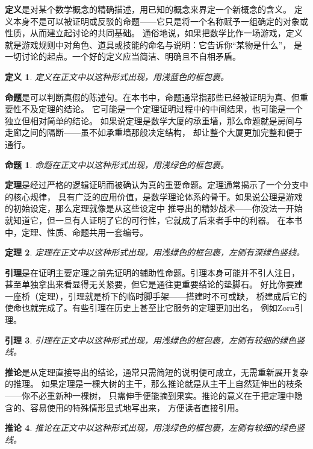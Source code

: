 \documentclass[fontset=none]{ctexbook} %
\newtheorem{theorem}{定理}[section]
\newtheorem{corollary}[theorem]{推论}
\newtheorem{proposition}[theorem]{命题}
\newtheorem{lemma}[theorem]{引理}
\newtheorem{definition}{定义}[section]
\theoremstyle{plain}
\numberwithin{equation}{subsection}%
\numberwithin{figure}{subsection}
\begin{document}
\textbf{定义}是对某个数学概念的精确描述，用已知的概念来界定一个新概念的含义。
定义本身不是可以被证明或反驳的命题——它只是将一个名称赋予一组确定的对象或性质，从而建立起讨论的共同基础。
通俗地说，如果把数学比作一场游戏，定义就是游戏规则中对角色、道具或技能的命名与说明：它告诉你“某物是什么”，
是一切讨论的起点。一个好的定义应当简洁、明确且不自相矛盾。
\begin{definition}
  定义在正文中以这种形式出现，用浅蓝色的框包裹。
\end{definition}

\textbf{命题}是可以判断真假的陈述句。在本书中，命题通常指那些已经被证明为真、但重要性不及定理的结论。
它可能是一个定理证明过程中的中间结果，也可能是一个独立但相对简单的结论。
如果说定理是数学大厦的承重墙，那么命题就是房间与走廊之间的隔断——虽不如承重墙那般决定结构，
却让整个大厦更加完整和便于通行。
\begin{proposition}
  命题在正文中以这种形式出现，用浅绿色的框包裹。
\end{proposition}

\textbf{定理}是经过严格的逻辑证明而被确认为真的重要命题。定理通常揭示了一个分支中的核心规律，
具有广泛的应用价值，是数学理论体系的骨干。如果说公理是游戏的初始设定，那么定理就像是从这些设定中
推导出的精妙战术——你没法一开始就知道它，但一旦有人证明了它的可行性，它就成了后来者手中的利器。
在本书中，定理、性质、命题共用一套编号。
\begin{theorem}
  定理在正文中以这种形式出现，用浅绿色的框包裹，左侧有深绿色竖线。
\end{theorem}

\textbf{引理}是在证明主要定理之前先证明的辅助性命题。引理本身可能并不引人注目，
甚至单独拿出来看显得无关紧要，但它是通往更重要结论的垫脚石。
好比你要建一座桥（定理），引理就是桥下的临时脚手架——搭建时不可或缺，
桥建成后它的使命也就完成了。有些引理在历史上甚至比它服务的定理更加出名，
例如Zorn引理。
\begin{lemma}
  引理在正文中以这种形式出现，用浅绿色的框包裹，左侧有较细的绿色竖线。
\end{lemma}

\textbf{推论}是从定理直接导出的结论，通常只需简短的说明便可成立，无需重新展开复杂的推理。
如果定理是一棵大树的主干，那么推论就是从主干上自然延伸出的枝条——你不必重新种一棵树，
只需伸手便能摘到果实。推论的意义在于把定理中隐含的、容易使用的特殊情形显式地写出来，
方便读者直接引用。
\begin{corollary}
  推论在正文中以这种形式出现，用浅绿色的框包裹，左侧有较细的绿色竖线。
\end{corollary}
\end{document}
